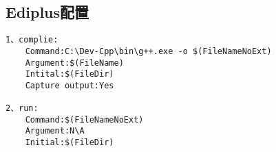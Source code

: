 \subsection{Ediplus配置}
\begin{verbatim}
1、complie:
    Command:C:\Dev-Cpp\bin\g++.exe -o $(FileNameNoExt)
    Argument:$(FileName)
    Intital:$(FileDir)
    Capture output:Yes

2、run:
    Command:$(FileNameNoExt)
    Argument:N\A
    Initial:$(FileDir)
\end{verbatim}
